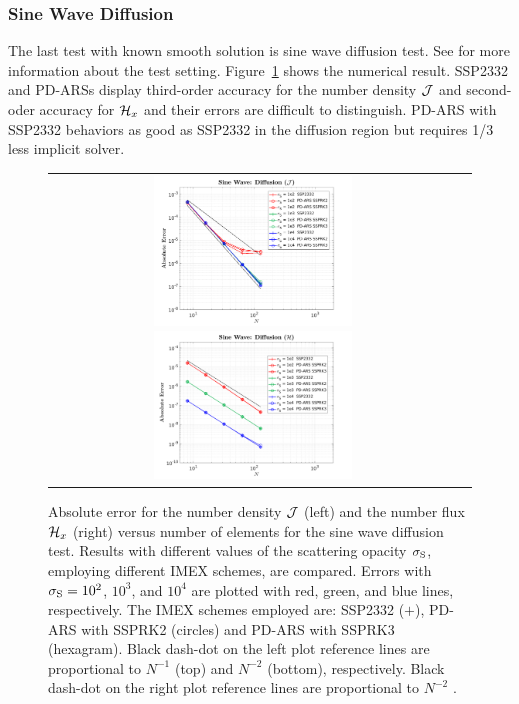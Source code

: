 \subsubsection{Sine Wave Diffusion}
The last test with known smooth solution is sine wave diffusion test.
See \cite{chu_2018} for more information about the test setting.
Figure~\ref{fig:SineWaveDiffusionJ} shows the numerical result.
SSP2332 and PD-ARSs display third-order accuracy for the number density $\mathcal{J}$ and second-oder accuracy for $\mathcal{H}_{x}$ and their errors are difficult to distinguish.
PD-ARS with SSP2332 behaviors as good as SSP2332 in the diffusion region but requires 1/3 less implicit solver.
\begin{figure}[h]
  \centering
  \begin{tabular}{cc}
    \includegraphics[width=0.5\textwidth]{figures/SineWaveDiffusionJ}
    \includegraphics[width=0.5\textwidth]{figures/SineWaveDiffusionH}
  \end{tabular}
   \caption{Absolute error for the number density $\mathcal{J}$ (left) and the number flux $\mathcal{H}_{x}$ (right) versus number of elements for the sine wave diffusion test.  Results with different values of the scattering opacity $\sigma_{{\rm S}}$, employing different IMEX schemes, are compared.  Errors with $\sigma_{{\rm S}}=10^{2}$, $10^{3}$, and $10^{4}$ are plotted with red, green, and blue lines, respectively.  The IMEX schemes employed are:  SSP2332 ($+$), PD-ARS with SSPRK2 (circles) and PD-ARS with SSPRK3 (hexagram). Black dash-dot on the left plot reference lines are proportional to $N^{-1}$ (top) and $N^{-2}$ (bottom), respectively. Black dash-dot on the right plot reference lines are proportional to $N^{-2}$ .}
   \label{fig:SineWaveDiffusionJ}
\end{figure}

